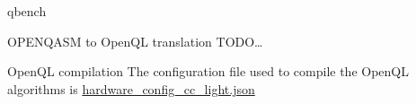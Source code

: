 \documentclass[11pt]{beamer}
\begin{document}
\begin{frame}[fragile,label={sec:org639c711}]{qbench}
\begin{block}{OPENQASM to OpenQL translation}
TODO\ldots{}
\end{block}

\begin{block}{OpenQL compilation}
The configuration file used to compile the OpenQL algorithms is \url{hardware\_config\_cc\_light.json}
\end{block}
\end{frame}
\end{document}

